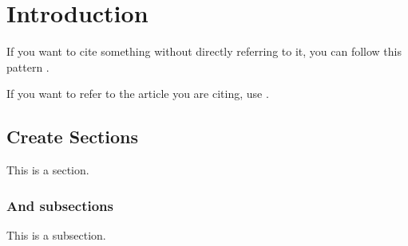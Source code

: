 \chapter{Introduction}

If you want to cite something without directly referring to it, you can follow this pattern \cite{bishop_2006}.

If you want to refer to the article you are citing, use \citet{bishop_2006}.

\section{Create Sections}

This is a section.

\subsection{And subsections}

This is a subsection.
